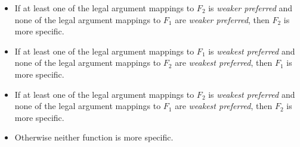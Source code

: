 \begin{itemize}
\item If at least one of the legal argument mappings to $F_2$ is {\em
weaker preferred} and none of the legal argument mappings to $F_1$ are
{\em weaker preferred}, then $F_2$ is more specific.

\item If at least one of the legal argument mappings to $F_1$ is {\em
weakest preferred} and none of the legal argument mappings to $F_2$ are
{\em weakest preferred}, then $F_1$ is more specific.

\item If at least one of the legal argument mappings to $F_2$ is {\em
weakest preferred} and none of the legal argument mappings to $F_1$ are
{\em weakest preferred}, then $F_2$ is more specific.

\item Otherwise neither function is more specific.
\end{itemize}

